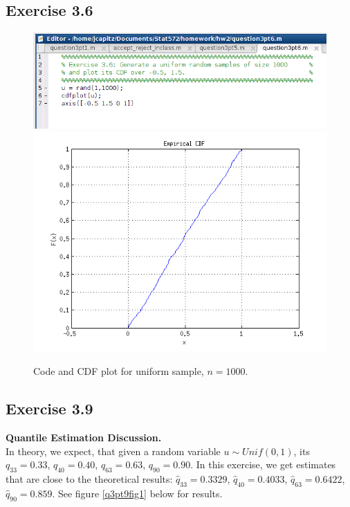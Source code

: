 \documentclass[12pt,a4paper]{article}
\begin{document}
\subsection*{Exercise 3.6}

\begin{figure}[ht!]
\begin{center}
\includegraphics[scale=.50]{q3pt6_code.png}
\includegraphics[scale=.70]{q3pt6_plot.png}
\caption{Code and CDF plot for uniform sample, $n=1000$.}
\label{q3pt6fig1}
\end{center}
\end{figure}
\FloatBarrier

\subsection*{Exercise 3.9}

\textbf{Quantile Estimation Discussion.}\\

In theory, we expect, that given a random variable $u\sim Unif(0,1)$, its $q_{33}=0.33$, $q_{40}=0.40$, $q_{63}=0.63$, $q_{90}=0.90$. In this exercise, we get estimates that are close to the theoretical results: $\hat{q}_{33}=0.3329$, $\hat{q}_{40}=0.4033$, $\hat{q}_{63}=0.6422$, $\hat{q}_{90}=0.859$. See figure \ref{q3pt9fig1} below for results.
\end{document}
